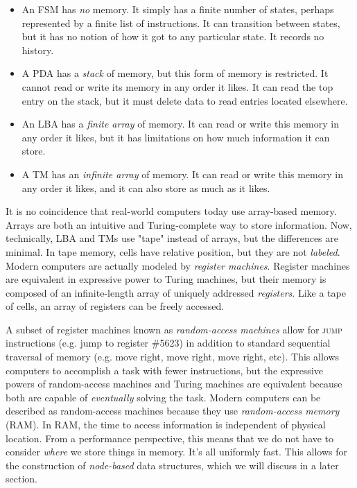 \vspace{4mm}
\begin{itemize}
    \item An FSM has \textit{no} memory. It simply has a finite number of states, perhaps represented by a finite list of instructions. It can transition between states, but it has no notion of how it got to any particular state. It records no history.
    \item A PDA has a \textit{stack} of memory, but this form of memory is restricted. It cannot read or write its memory in any order it likes. It can read the top entry on the stack, but it must delete data to read entries located elsewhere.
    \item An LBA has a \textit{finite array} of memory. It can read or write this memory in any order it likes, but it has limitations on how much information it can store.
    \item A TM has an \textit{infinite array} of memory. It can read or write this memory in any order it likes, and it can also store as much as it likes.
\end{itemize}
\vspace{5mm}

It is no coincidence that real-world computers today use array-based memory. Arrays are both an intuitive and Turing-complete way to store information. Now, technically, LBA and TMs use "tape" instead of arrays, but the differences are minimal. In tape memory, cells have relative position, but they are not \textit{labeled}. Modern computers are actually modeled by \textit{register machines}. Register machines are equivalent in expressive power to Turing machines, but their memory is composed of an infinite-length array of uniquely addressed \textit{registers}. Like a tape of cells, an array of registers can be freely accessed.

A subset of register machines known as \textit{random-access machines} allow for \textsc{jump} instructions (e.g. jump to register \#5623) in addition to standard sequential traversal of memory (e.g. move right, move right, move right, etc). This allows computers to accomplish a task with fewer instructions, but the expressive powers of random-access machines and Turing machines are equivalent because both are capable of \textit{eventually} solving the task. Modern computers can be described as random-access machines because they use \textit{random-access memory} (RAM). In RAM, the time to access information is independent of physical location. From a performance perspective, this means that we do not have to consider \textit{where} we store things in memory. It's all uniformly fast. This allows for the construction of \textit{node-based} data structures, which we will discuss in a later section.

